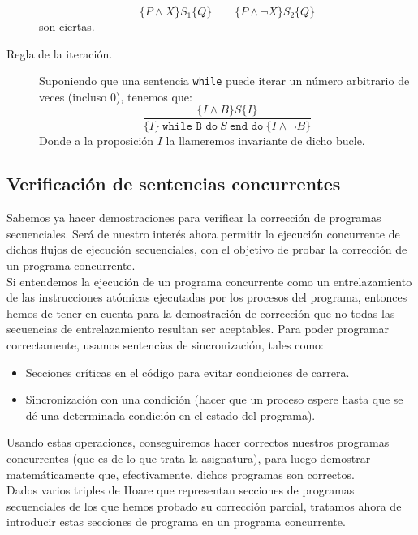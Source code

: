 \begin{description}
        \begin{equation*}
            \{P\land X\}S_1\{Q\}\qquad \{P\land \lnot X\}S_2\{Q\}
        \end{equation*}
        son ciertas.
    \item [Regla de la iteración.] 
        Suponiendo que una sentencia \verb|while| puede iterar un número arbitrario de veces (incluso 0), tenemos que:
        \begin{equation*}
            \dfrac{\{I\land B\}S\{I\}}{\{I\}\ \texttt{while B do}\ S\ \texttt{end do}\ \{I\land \lnot B\}}
        \end{equation*}
        Donde a la proposición $I$ la llameremos invariante de dicho bucle.
\end{description}

\subsection{Verificación de sentencias concurrentes}
Sabemos ya hacer demostraciones para verificar la corrección de programas secuenciales. Será de nuestro interés ahora permitir la ejecución concurrente de dichos flujos de ejecución secuenciales, con el objetivo de probar la corrección de un programa concurrente.\\

Si entendemos la ejecución de un programa concurrente como un entrelazamiento de las instrucciones atómicas ejecutadas por los procesos del programa, entonces hemos de tener en cuenta para la demostración de corrección que no todas las secuencias de entrelazamiento resultan ser aceptables. Para poder programar correctamente, usamos sentencias de sincronización, tales como:
\begin{itemize}
    \item Secciones críticas en el código para evitar condiciones de carrera.
    \item Sincronización con una condición (hacer que un proceso espere hasta que se dé una determinada condición en el estado del programa).
\end{itemize}
Usando estas operaciones, conseguiremos hacer correctos nuestros programas concurrentes (que es de lo que trata la asignatura), para luego demostrar matemáticamente que, efectivamente, dichos programas son correctos.\\

Dados varios triples de Hoare que representan secciones de programas secuenciales de los que hemos probado su corrección parcial, tratamos ahora de introducir estas secciones de programa en un programa concurrente.

